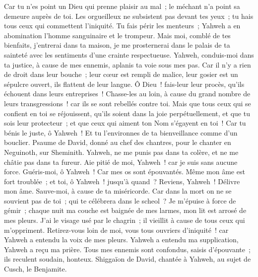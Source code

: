 \begin{multicols}{2}
Car tu n'es point un Dieu qui prenne plaisir au mal~; le méchant n'a point sa demeure auprès de toi.
Les orgueilleux ne subsistent pas devant tes yeux~; tu hais tous ceux qui commettent l'iniquité.
Tu fais périr les menteurs~; Yahweh a en abomination l'homme sanguinaire et le trompeur.
Mais moi, comblé de tes bienfaits, j'entrerai dans ta maison, je me prosternerai dans le palais de ta sainteté avec les sentiments d'une crainte respectueuse.
Yahweh, conduis-moi dans ta justice, à cause de mes ennemis, aplanis ta voie sous mes pas.
Car il n'y a rien de droit dans leur bouche~; leur cœur est rempli de malice, leur gosier est un sépulcre ouvert, ils flattent de leur langue.
Ô Dieu~! fais-leur leur procès, qu'ils échouent dans leurs entreprises~! Chasse-les au loin, à cause du grand nombre de leurs transgressions~! car ils se sont rebellés contre toi.
Mais que tous ceux qui se confient en toi se réjouissent, qu'ils soient dans la joie perpétuellement, et que tu sois leur protecteur~; et que ceux qui aiment ton Nom s'égayent en toi~!
Car tu bénis le juste, ô Yahweh~! Et tu l'environnes de ta bienveillance comme d'un bouclier.
\VerseOne{}Psaume de David, donné au chef des chantres, pour le chanter en Neguinoth, sur Sheminith.
Yahweh, ne me punis pas dans ta colère, et ne me châtie pas dans ta fureur.
Aie pitié de moi, Yahweh~! car je suis sans aucune force. Guéris-moi, ô Yahweh~! Car mes os sont épouvantés.
Même mon âme est fort troublée~; et toi, ô Yahweh~! jusqu'à quand~?
Reviens, Yahweh~! Délivre mon âme. Sauve-moi, à cause de ta miséricorde.
Car dans la mort on ne se souvient pas de toi~; qui te célébrera dans le scheol~?
Je m'épuise à force de gémir~; chaque nuit ma couche est baignée de mes larmes, mon lit est arrosé de mes pleurs.
J'ai le visage usé par le chagrin~; il vieillit à cause de tous ceux qui m'oppriment.
Retirez-vous loin de moi, vous tous ouvriers d'iniquité~! car Yahweh a entendu la voix de mes pleurs.
Yahweh a entendu ma supplication, Yahweh a reçu ma prière.
Tous mes ennemis sont confondus, saisis d'épouvante~; ils reculent soudain, honteux.
\VerseOne{}Shiggaïon de David, chantée à Yahweh, au sujet de Cusch, le Benjamite.

\end{multicols}
